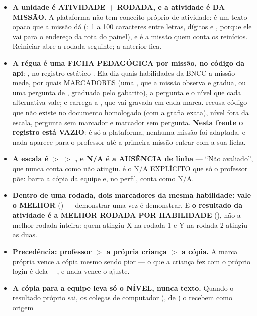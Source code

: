 \begin{itemize}
  \item \textbf{A unidade é ATIVIDADE + RODADA, e a atividade é DA MISSÃO.} A
    plataforma não tem conceito próprio de atividade:  é um
    texto opaco que a missão dá (: 1 a 100 caracteres
    entre letras, dígitos e , porque ele vai para o endereço da
    rota do painel), e é a missão quem conta os reinícios. Reiniciar abre a
    rodada seguinte; a anterior fica.
  \item \textbf{A régua é uma FICHA PEDAGÓGICA por missão, no código da api}:
    , no registro estático . Ela
    diz quais habilidades da BNCC a missão mede, por quais MARCADORES (uma
    , que a missão observa e gradua, ou uma pergunta de
    , graduada pelo gabarito), a pergunta e o nível que
    cada alternativa vale; e carrega a , que vai gravada em cada marca.
     recusa código que não existe no documento homologado (com
    a grafia exata), nível fora da escala, pergunta sem marcador e marcador sem
    pergunta. \textbf{Nesta frente o registro está VAZIO}: é só a plataforma,
    nenhuma missão foi adaptada, e nada aparece para o professor até a
    primeira missão entrar com a sua ficha.
  \item \textbf{A escala é  $>$  $>$
    , e N/A é a AUSÊNCIA de linha} --- \enquote{Não avaliado},
    que nunca conta como não atingiu.  é o N/A EXPLÍCITO
    que só o professor põe: barra a cópia da equipe e, no perfil, conta como
    N/A.
  \item \textbf{Dentro de uma rodada, dois marcadores da mesma habilidade: vale
    o MELHOR} () --- demonstrar uma vez é demonstrar. E
    \textbf{o resultado da atividade é a MELHOR RODADA POR HABILIDADE}
    (), não a melhor rodada inteira: quem atingiu
    X na rodada 1 e Y na rodada 2 atingiu as duas.
  \item \textbf{Precedência: professor $>$ a própria criança $>$ a cópia.} A
    marca própria vence a cópia mesmo sendo pior --- o que a criança fez com o
    próprio login é dela ---, e nada vence o ajuste.
  \item \textbf{A cópia para a equipe leva só o NÍVEL, nunca texto.} Quando o
    resultado próprio sai, os colegas de computador (, de
    ) o recebem como origem 

\end{itemize}
